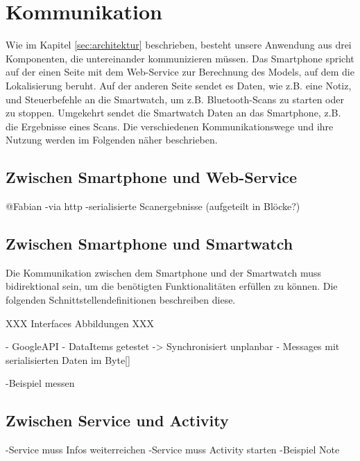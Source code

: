 \section{Kommunikation}
Wie im Kapitel \ref{sec:architektur} beschrieben, besteht unsere Anwendung aus drei Komponenten, die untereinander kommunizieren müssen. Das Smartphone spricht auf der einen Seite mit dem Web-Service zur Berechnung des Models, auf dem die Lokalisierung beruht. Auf der anderen Seite sendet es Daten, wie z.B. eine Notiz, und Steuerbefehle an die Smartwatch, um z.B. Bluetooth-Scans zu starten oder zu stoppen. Umgekehrt sendet die Smartwatch Daten an das Smartphone, z.B. die Ergebnisse eines Scans. Die verschiedenen Kommunikationswege und ihre Nutzung werden im Folgenden näher beschrieben.

\subsection{Zwischen Smartphone und Web-Service}
@Fabian
-via http
-serialisierte Scanergebnisse (aufgeteilt in Blöcke?)


\subsection{Zwischen Smartphone und Smartwatch}
Die Kommunikation zwischen dem Smartphone und der Smartwatch muss bidirektional sein, um die benötigten Funktionalitäten erfüllen zu können. Die folgenden Schnittstellendefinitionen beschreiben diese.

XXX Interfaces Abbildungen XXX


- GoogleAPI
	- DataItems getestet -> Synchronisiert  unplanbar
	- Messages mit serialisierten Daten im Byte[]

-Beispiel messen

\subsection{Zwischen Service und Activity}
-Service muss Infos weiterreichen
-Service muss Activity starten
-Beispiel Note

